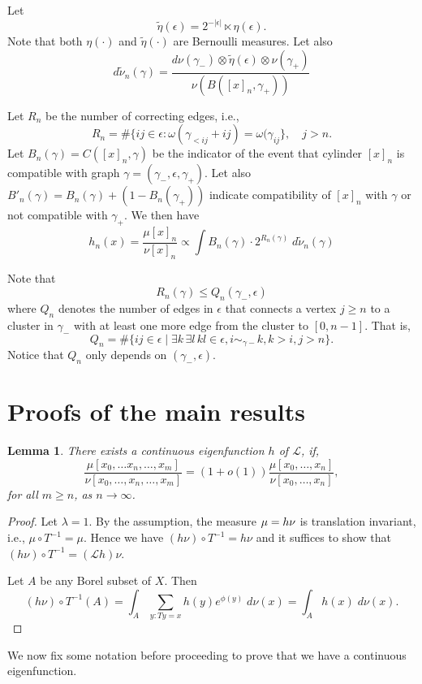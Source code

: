 \documentclass[11pt, a4paper]{amsart}
\newtheorem{lem}[thm]{Lemma}
\theoremstyle{definition}
\theoremstyle{remark}
\providecommand{\e}{\epsilon}
\providecommand{\g}{\gamma}
\def\X{X}
\begin{document}
Let
$$
\tilde \eta(\epsilon)= 2^{-|\epsilon|} \ltimes \eta (\epsilon).
$$
Note that both $\eta(\cdot)$ and $\tilde\eta (\cdot)$ are Bernoulli measures.
Let also
$$
d\tilde \nu_n(\gamma) =
\frac{d\nu(\gamma_-)\otimes \tilde \eta(\epsilon)\otimes \nu(\gamma_+)}{\nu(B([x]_n,\gamma_+))}
$$

Let $R_n$ be the number of correcting edges, i.e.,
$$
R_n=\# \{ij\in \epsilon: \omega (\gamma_{< ij}+ij)=\omega (\gamma_{ij}\},\quad j>n.
$$
Let $B_n(\g)=C([x]_n,\gamma)$ be the indicator of the event that cylinder $[x]_n$ is compatible with graph $\g=(\g_-,\e,\g_+)$.
Let also $B'_n(\g) = B_n(\g) + (1-B_n(\g_+))$ indicate compatibility of $[x]_n$ with $\g$ or not compatible with $\g_+$.
We then have
\[
  h_n(x) = \frac{\mu [x]_n}{\nu [x]_n}\propto \int B_n(\g) \cdot 2^{R_n(\g)} \; d\tilde \nu_n (\gamma)
\]

Note that
$$ R_n(\g) \le Q_n(\g_-,\e) $$
where $Q_n$ denotes the number of edges in $\e$ that connects a vertex $j\ge n$ to a
cluster in $\g_-$ with at least one more edge from the cluster to $[0,n-1]$. That is,
$$  Q_n=\# \{ij \in \epsilon \mid  \exists k\, \exists l\, kl\in\e,  i \sim_{\gamma-} k, k>i, j > n\}.$$
Notice that $Q_n$ only depends on $(\gamma_-,\epsilon)$.



\section{Proofs of the main results}\noindent

\begin{lem}
  There exists a continuous eigenfunction $h$ of ${\mathcal L}$, if, 
$$\frac{\mu[x_0,\ldots x_n, \ldots, x_m]}{\nu[x_0,\ldots, x_n, \ldots, x_m]}=(1+o(1)) \frac{\mu[x_0,\ldots, x_n]}{\nu[x_0, \ldots, x_n]},$$
for all $m\geq n$, as $n\to \infty$.
\end{lem}
\begin{proof}
  Let $\lambda=1$. By the assumption, the measure $\mu= h \nu$ is translation
  invariant, i.e., $\mu\circ T^{-1}=\mu$. Hence we have $(h\nu)\circ
  T^{-1}=h\nu$ and it suffices to show that $(h\nu)\circ T^{-1}=({\mathcal
    L}h)\nu$.

  Let $A$ be any Borel subset of $\X$. Then
  $$(h\nu)\circ T^{-1} (A)=\int_A \sum_{y: Ty=x} h(y)e^{\phi(y)}\; d\nu(x)=\int_A h(x)\; d\nu(x).$$
\end{proof}

\noindent
We now fix some notation before proceeding to prove that we have a continuous eigenfunction.
\newline
\end{document}
